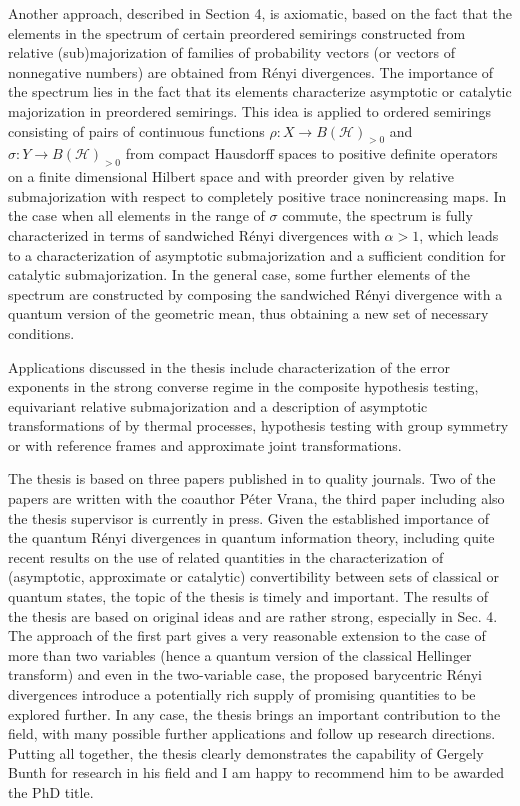 \documentclass[12pt]{article}
\begin{document}
Another approach, described in Section 4, is axiomatic, based on the fact that the
elements in the spectrum of certain preordered semirings constructed from relative
(sub)majorization of families of probability vectors (or vectors of nonnegative numbers)
are obtained from R\'enyi divergences.  The importance of the spectrum lies in the fact
that its elements characterize asymptotic or catalytic majorization in preordered semirings. 
This idea is applied to ordered semirings consisting of  pairs of continuous functions 
$\rho:X\to B(\mathcal H)_{>0}$ and $\sigma: Y\to B(\mathcal H)_{>0}$ from compact Hausdorff spaces to
positive definite operators on a finite dimensional Hilbert space and with preorder given by
relative submajorization with respect to completely positive trace nonincreasing maps. 
In the case when all elements in the range of $\sigma$ commute, the spectrum is fully
characterized in terms of sandwiched R\'enyi divergences with $\alpha>1$, which leads to a
characterization of asymptotic submajorization and a sufficient condition for catalytic
submajorization. In the general
case, some further elements of the spectrum are constructed by composing the sandwiched
R\'enyi divergence with a quantum version of the geometric mean, thus obtaining a new set of
necessary conditions.

Applications discussed in the thesis include characterization of the error exponents
in the strong converse regime in the composite hypothesis testing, equivariant relative
submajorization and a description of asymptotic transformations of by thermal
processes, hypothesis testing with group symmetry or with reference frames and  approximate
joint transformations. 

The thesis is based on  three papers published in to quality journals. Two of the papers
are written with the coauthor P\'eter Vrana, the  third paper including also the thesis supervisor is currently  in
press. 
Given the established importance of the quantum R\'enyi divergences in quantum information
theory, including quite recent results on the use of related quantities in the
characterization of (asymptotic, approximate or catalytic) convertibility between sets of
classical or quantum states, the topic of the thesis is timely and important. The results of the thesis
are based on original ideas and are rather strong, especially in Sec. 4. The approach of the first part
 gives a very reasonable extension to the case of more than two variables (hence a quantum
 version of the classical Hellinger transform) and even in the two-variable case, the proposed barycentric R\'enyi
divergences introduce a potentially  rich supply of promising  quantities to be explored
further. In any case, the thesis brings an important contribution to the field, with many possible
further applications and follow up research directions. Putting all together, the thesis
clearly demonstrates the capability of Gergely Bunth for research in his field and I am
happy to recommend him to be awarded the PhD title.
\end{document}
